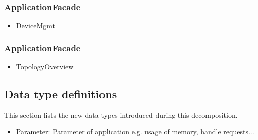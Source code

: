    \subsubsection{ApplicationFacade}
        \begin{itemize}
            \item DeviceMgmt
        \end{itemize}

    \subsubsection{ApplicationFacade}
        \begin{itemize}
            \item TopologyOverview
        \end{itemize}


\subsection{Data type definitions}
    This section lists the new data types introduced during this decomposition.

    \begin{itemize}
        \item Parameter: Parameter of application e.g. usage of memory, handle requests...
    \end{itemize}
